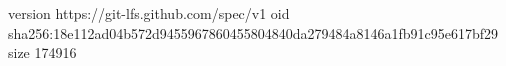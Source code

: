 version https://git-lfs.github.com/spec/v1
oid sha256:18e112ad04b572d9455967860455804840da279484a8146a1fb91c95e617bf29
size 174916
